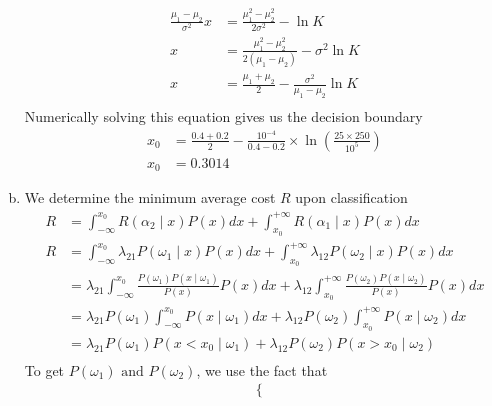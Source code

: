 \documentclass[a4paper, 10pt, twoside]{article}
\begin{document}
\begin{enumerate}[a)]
\begin{align*}
              \frac{\mu_1-\mu_2}{\sigma^2}x                                             & = \frac{\mu_1^2-\mu_2^2}{2\sigma^2} - \ln K                     \\
              x                                                                         & = \frac{\mu_1^2-\mu_2^2}{2(\mu_1-\mu_2)} - \sigma^2\ln K        \\
              x                                                                         & = \frac{\mu_1 + \mu_2}{2} - \frac{\sigma^2}{\mu_1-\mu_2}\ln K   \\
          \end{align*}
          Numerically solving this equation gives us the decision boundary
          \begin{align*}
              x_0 & = \frac{0.4 + 0.2}{2} - \frac{10^{-4}}{0.4-0.2} \times \ln (\frac{25\times250}{10^5}) \\
              x_0 & = 0.3014
          \end{align*}
    \item We determine the minimum average cost $R$ upon classification
          \begin{align*}
              R & = \int_{-\infty}^{x_0} R(\alpha_2 \mid x) P(x)dx + \int_{x_0}^{+\infty} R(\alpha_1 \mid x) P(x)dx                                                                         \\
              R & = \int_{-\infty}^{x_0} \lambda_{21}P(\omega_1 \mid x) P(x)dx + \int_{x_0}^{+\infty} \lambda_{12}P(\omega_2 \mid x) P(x)dx                                                 \\
                & = \lambda_{21}\int_{-\infty}^{x_0} \frac{P(\omega_1)P(x \mid \omega_1)}{P(x)} P(x)dx + \lambda_{12}\int_{x_0}^{+\infty} \frac{P(\omega_2)P(x \mid \omega_2)}{P(x)} P(x)dx \\
                & = \lambda_{21}P(\omega_1) \int_{-\infty}^{x_0} P(x \mid \omega_1) dx + \lambda_{12} P(\omega_2) \int_{x_0}^{+\infty} P(x \mid \omega_2) dx                                \\
                & = \lambda_{21}P(\omega_1) P(x < x_0 \mid \omega_1) + \lambda_{12} P(\omega_2) P(x > x_0 \mid \omega_2)                                                                    \\
          \end{align*}
          To get $P(\omega_1) \text{ and } P(\omega_2)$, we use the fact that
          \begin{align*}
              \begin{cases}

\end{cases}
\end{align*}
\end{enumerate}
\end{document}
